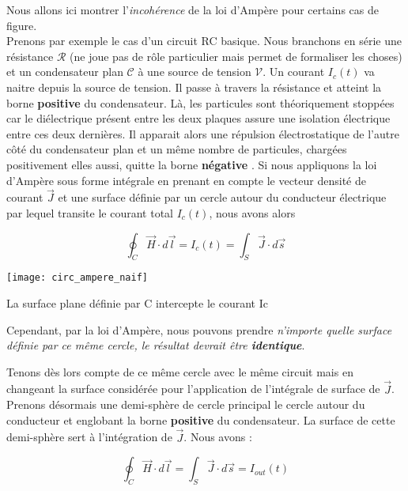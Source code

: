 Nous allons ici montrer l'\textit{incohérence} de la loi d'Ampère pour certains cas de figure. \\
Prenons par exemple  le cas d'un circuit RC basique. Nous branchons en série une résistance $\mathcal{R}$ (ne joue pas de rôle particulier mais permet de formaliser les choses) et un condensateur plan $\mathcal{C}$ à une source de tension $\mathcal{V}$. Un courant $I_{c}(t)$ va naitre depuis la source de tension. Il passe à travers la résistance et atteint la borne \textbf{positive} du condensateur. Là, les particules sont théoriquement stoppées car le diélectrique présent entre les deux plaques assure une isolation électrique entre ces deux dernières. Il apparait alors une répulsion électrostatique de l'autre côté du condensateur plan  et un même nombre de particules, chargées positivement elles aussi, quitte la borne \textbf{négative} . Si nous appliquons la loi d'Ampère sous forme intégrale en prenant en compte le vecteur densité de courant $\vec{J}$ et une surface définie par un cercle autour du conducteur électrique par lequel transite le courant total $I_{c}(t)$, nous avons alors 

\[  \oint_{C} \vec{H} \cdot d\vec{l} = I_{c}(t) = \int_{S} \vec{J} \cdot d\vec{s} \]

\begin{marginfigure}[0cm]
	\texttt{[image: circ\_ampere\_naif]}
	\caption{La surface plane définie par C intercepte le courant Ic}
\end{marginfigure}

Cependant, par la loi d'Ampère, nous pouvons prendre \textit{n'importe quelle surface définie par ce même cercle, le résultat devrait être \textbf{identique}}.

Tenons dès lors compte de ce même cercle avec le même circuit mais en changeant la surface considérée pour l'application de l'intégrale de surface de $\vec{J}$. 
Prenons désormais une demi-sphère de cercle principal le cercle autour du conducteur et englobant la borne \textbf{positive} du condensateur. La surface de cette demi-sphère sert
à l'intégration de $\vec{J}$. Nous avons : 

\[  \oint_{C} \vec{H} \cdot d\vec{l} =  \int_{S} \vec{J} \cdot d\vec{s} = I_{out}(t)\] 

